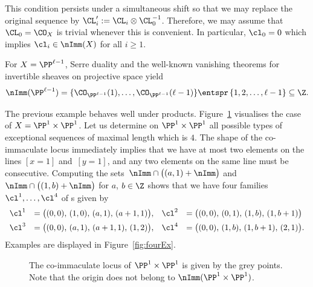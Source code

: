 This condition persists under a 
simultaneous shift so that we 
may replace the original sequence by 
$\CL_i':=\CL_i\otimes\CL_0^{-1}$. 
Therefore, we may assume that 
$\CL_0=\CO_X$ is trivial whenever this 
is convenient. In particular, $\cl_0=0$ 
which implies $\cl_i\in\nImm(X)$ for 
all $i\geq 1$.

\begin{exam}\label{ex:PnP1}
For $X=\PP^{\ell-1}$, Serre duality and 
the well-known vanishing theorems for 
invertible sheaves on projective space 
yield 
$$
\nImm(\PP^{\ell-1})=\{\CO_{\PP^{\ell-1}}(1),\ldots,
\CO_{\PP^{\ell-1}}(\ell-1)\}
\entspr\,\{1,2,\ldots,\ell-1\}\subseteq\Z.
$$
\end{exam}

\begin{exam}\label{ex:P1P1}
The previous example behaves well under 
products. Figure~\ref{fig:ImmP2P2} 
visualises the case of $X=\PP^1\times\PP^1$. 
Let us determine on $\PP^1\times\PP^1$ all 
possible types of exceptional sequences of 
maximal length which is $4$. The shape of 
the {co-immaculate} locus immediately implies 
that we have at most two elements on the 
lines $[x=1]$ and~$[y=1]$, and any two 
elements on the same line must be 
consecutive. Computing the sets~$\nImm\cap\big((a,1)+\nImm\big)$ and 
$\nImm\cap\big((1,b)+\nImm\big)$ for 
$a$, $b\in\Z$ shows that we have four 
families~$\cl^1,\ldots,\cl^4$ of {\mes}{s}
given by
$$
\begin{array}{llll}
\cl^1&=\big((0,0),\,(1,0),\,(a,1),\,(a+1,1)\big),&
\cl^2&=\big((0,0),\,(0,1),\,(1,b),\,(1,b+1)\big)\\[5pt]
\cl^3&=\big((0,0),\,(a,1),\,(a+1,1),\,(1,2)\big),&
\cl^4&=\big((0,0),\,(1,b),\,(1,b+1),\,(2,1)\big).
\end{array}
$$
Examples are displayed in Figure~\ref{fig:fourEx}.

\begin{figure}[ht]
\caption{The {co-immaculate} locus of
$\PP^1\times\PP^1$ is given by the 
grey points. Note that the origin 
does not belong to
$\nImm(\PP^1\times\PP^1)$.}
\label{fig:ImmP2P2}
\end{figure}
\end{exam}


